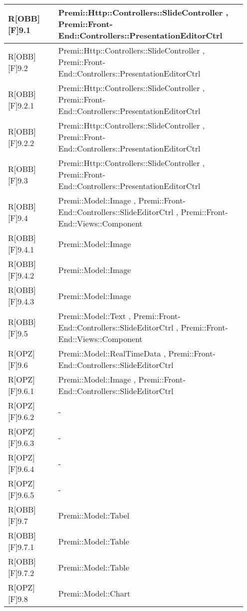 \begin{table}[h]
	\begin{center}
		\begin{tabular}{|p{0.2\linewidth}|p{0.75\linewidth}|}
			\toprule
			R[OBB][F]9.1 & Premi::Http::Controllers::SlideController , Premi::Front-End::Controllers::PresentationEditorCtrl\\
		\midrule
			R[OBB][F]9.2 & Premi::Http::Controllers::SlideController , Premi::Front-End::Controllers::PresentationEditorCtrl\\
		\midrule
			R[OBB][F]9.2.1 & Premi::Http::Controllers::SlideController , Premi::Front-End::Controllers::PresentationEditorCtrl\\
		\midrule
			R[OBB][F]9.2.2 & Premi::Http::Controllers::SlideController , Premi::Front-End::Controllers::PresentationEditorCtrl\\
		\midrule
			R[OBB][F]9.3 & Premi::Http::Controllers::SlideController , Premi::Front-End::Controllers::PresentationEditorCtrl\\
		\midrule
			R[OBB][F]9.4 & Premi::Model::Image , Premi::Front-End::Controllers::SlideEditorCtrl , Premi::Front-End::Views::Component\\
		\midrule
			R[OBB][F]9.4.1 & Premi::Model::Image\\
		\midrule
			R[OBB][F]9.4.2 & Premi::Model::Image\\
		\midrule
			R[OBB][F]9.4.3 & Premi::Model::Image\\
		\midrule
			R[OBB][F]9.5 & Premi::Model::Text , Premi::Front-End::Controllers::SlideEditorCtrl , Premi::Front-End::Views::Component\\
		\midrule
			R[OPZ][F]9.6 & Premi::Model::RealTimeData , Premi::Front-End::Controllers::SlideEditorCtrl\\
		\midrule
			R[OPZ][F]9.6.1 & Premi::Model::Image , Premi::Front-End::Controllers::SlideEditorCtrl\\
		\midrule
			R[OPZ][F]9.6.2 & -\\
		\midrule
			R[OPZ][F]9.6.3 & -\\
		\midrule
			R[OPZ][F]9.6.4 & -\\
		\midrule
			R[OPZ][F]9.6.5 & -\\
		\midrule
			R[OBB][F]9.7 & Premi::Model::Tabel\\
		\midrule
			R[OBB][F]9.7.1 & Premi::Model::Table\\
		\midrule
			R[OBB][F]9.7.2 & Premi::Model::Table\\
		\midrule
			R[OPZ][F]9.8 & Premi::Model::Chart\\

\end{tabular}
\end{center}
\end{table}
